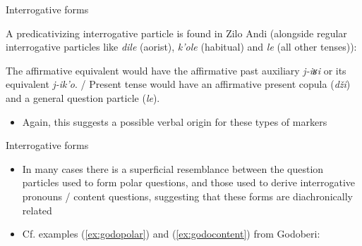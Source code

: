 \begin{frame}{Interrogative forms}

A predicativizing interrogative particle is found in Zilo Andi (alongside regular interrogative particles like \textit{dile} (aorist), \textit{k'ole} (habitual) and \textit{le} (all other tenses)):


The affirmative equivalent would have the affirmative past auxiliary \textit{j-iʁi} or its equivalent \textit{j-ik'o}. / Present tense would have an affirmative present copula (\textit{dži}) and a general question particle (\textit{le}).

\pause
\vfill 
\begin{itemize}
    \item Again, this suggests a possible verbal origin for these types of markers
\end{itemize}
\end{frame}

\begin{frame}{Interrogative forms}

\begin{itemize}
\item In many cases there is a superficial resemblance between the question particles used to form polar questions, and those used to derive interrogative pronouns / content questions, suggesting that these forms are diachronically related
\pause
\item Cf. examples (\ref{ex:godopolar}) and (\ref{ex:godocontent}) from Godoberi: \citep{kibriketal1996}


\end{itemize}
\end{frame}

